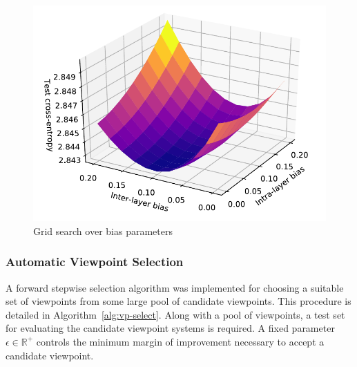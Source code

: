 \documentclass[12pt,a4paper,twoside,openright]{report}
\begin{document}
\begin{figure}[H]
\centering
\includegraphics[width=350pt]{figs/bias_plot.pdf}
\caption{Grid search over bias parameters}
\label{fig:grid-search}
\end{figure}

\subsubsection{Automatic Viewpoint Selection}

A forward stepwise selection algorithm was implemented for choosing a suitable
set of viewpoints from some large pool of candidate viewpoints. This procedure
is detailed in Algorithm~\ref{alg:vp-select}. Along with a pool of viewpoints,
a test set for evaluating the candidate viewpoint systems is required. A fixed
parameter $\epsilon \in \mathbb{R}^+$ controls the minimum margin of improvement
necessary to accept a candidate viewpoint.
\end{document}

